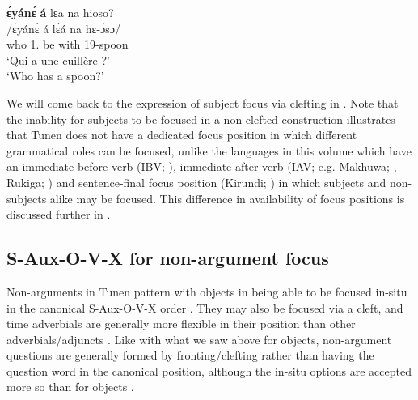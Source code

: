 \documentclass[output=paper,colorlinks,citecolor=brown
]{langscibook}
\begin{document}
\ea
\label{whospoon}
\glll
{\db}\textbf{ɛ́yánɛ́}	\textbf{á} lɛa	na hioso? \\
/ɛ́yánɛ́	á lɛ́á na	hɛ-ɔ́sɔ/ \\
{\db}who	1\SM{}.\REL{} be	with	19-spoon \\
\glt
`Qui a une cuillère ?' \\`Who has a spoon?' \jambox*{[EO 1433] }


\z

We will come back to the expression of subject focus via clefting in . Note that the inability for subjects to be focused in a non-clefted construction illustrates that Tunen does not have a dedicated focus position in which different grammatical roles can be focused, unlike the languages in this volume which have an immediate before verb (IBV; \cite{chapters/teke}), immediate after verb (IAV; e.g. Makhuwa; \cite{chapters/makhuwa}, Rukiga; \cite{chapters/rukiga}) and sentence\hyp final focus position (Kirundi; \cite{chapters/kirundi}) in which subjects and non-subjects alike may be focused. This difference in availability of focus positions is discussed further in \citet{KerrEtAl2023}.

\subsection{S-Aux-O-V-X for non-argument focus}
Non-arguments in Tunen pattern with objects in being able to be focused in-situ in the canonical S-Aux-O-V-X order . They may also be focused via a cleft, and time adverbials are generally more flexible in their position than other adverbials/adjuncts \citep[114--115]{KerrFut}. Like with what we saw above for objects, non-argument questions are generally formed by fronting/clefting  rather than having the question word in the canonical position, although the in-situ options are accepted more so than for objects .
\end{document}
